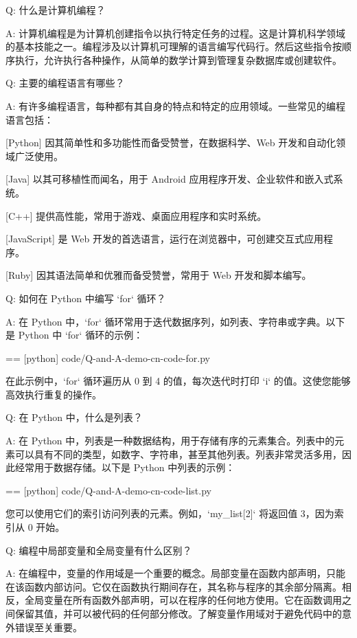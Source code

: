 
Q:
  什么是计算机编程？

A:
  计算机编程是为计算机创建指令以执行特定任务的过程。这是计算机科学领域的基本技能之一。编程涉及以计算机可理解的语言编写代码行。然后这些指令按顺序执行，允许执行各种操作，从简单的数学计算到管理复杂数据库或创建软件。

Q:
  主要的编程语言有哪些？

A:
  有许多编程语言，每种都有其自身的特点和特定的应用领域。一些常见的编程语言包括：

  [Python]
    因其简单性和多功能性而备受赞誉，在数据科学、Web 开发和自动化领域广泛使用。

  [Java]
    以其可移植性而闻名，用于 Android 应用程序开发、企业软件和嵌入式系统。

  [C++]
    提供高性能，常用于游戏、桌面应用程序和实时系统。

  [JavaScript]
    是 Web 开发的首选语言，运行在浏览器中，可创建交互式应用程序。

  [Ruby]
    因其语法简单和优雅而备受赞誉，常用于 Web 开发和脚本编写。

Q:
  如何在 Python 中编写 `for` 循环？

A:
  在 Python 中，`for` 循环常用于迭代数据序列，如列表、字符串或字典。以下是 Python 中 `for` 循环的示例：

  == [python] {code/Q-and-A-demo-cn-code-for.py}

  在此示例中，`for` 循环遍历从 0 到 4 的值，每次迭代时打印 `i` 的值。这使您能够高效执行重复的操作。

Q:
  在 Python 中，什么是列表？

A:
  在 Python 中，列表是一种数据结构，用于存储有序的元素集合。列表中的元素可以具有不同的类型，如数字、字符串，甚至其他列表。列表非常灵活多用，因此经常用于数据存储。以下是 Python 中列表的示例：

  == [python] {code/Q-and-A-demo-cn-code-list.py}

  您可以使用它们的索引访问列表的元素。例如，`my\_list[2]` 将返回值 3，因为索引从 0 开始。

Q:
  编程中局部变量和全局变量有什么区别？

A:
  在编程中，变量的作用域是一个重要的概念。局部变量在函数内部声明，只能在该函数内部访问。它仅在函数执行期间存在，其名称与程序的其余部分隔离。相反，全局变量在所有函数外部声明，可以在程序的任何地方使用。它在函数调用之间保留其值，并可以被代码的任何部分修改。了解变量作用域对于避免代码中的意外错误至关重要。

